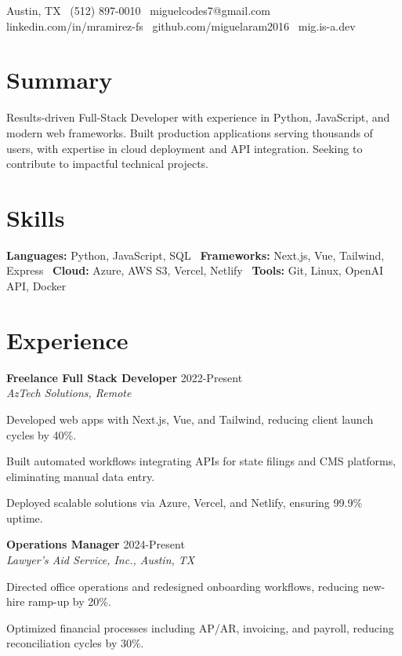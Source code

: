 \documentclass[letterpaper,10pt]{article}
\newcommand{\resumeItem}[1]{\item \small{#1}}
\begin{document}
\vspace{15pt}
 \vspace{8pt}
\begin{flushleft}
  Austin, TX \textbar\ (512) 897-0010 \textbar\ miguelcodes7@gmail.com \\
  linkedin.com/in/mramirez-fs \textbar\ github.com/miguelaram2016 \textbar\ mig.is-a.dev
\end{flushleft}
\vspace{6pt}

\section*{Summary}
Results-driven Full-Stack Developer with experience in Python, JavaScript, and modern web frameworks. Built production applications serving thousands of users, with expertise in cloud deployment and API integration. Seeking to contribute to impactful technical projects.

\section*{Skills}
\textbf{Languages:} Python, JavaScript, SQL \textbar\ \textbf{Frameworks:} Next.js, Vue, Tailwind, Express \textbar\ \textbf{Cloud:} Azure, AWS S3, Vercel, Netlify \textbar\ \textbf{Tools:} Git, Linux, OpenAI API, Docker

\section*{Experience}
\textbf{Freelance Full Stack Developer} \hfill 2022-Present \\
\textit{AzTech Solutions, Remote}
\begin{compactitem}
  \resumeItem{Developed web apps with Next.js, Vue, and Tailwind, reducing client launch cycles by 40\%.}
  \resumeItem{Built automated workflows integrating APIs for state filings and CMS platforms, eliminating manual data entry.}
  \resumeItem{Deployed scalable solutions via Azure, Vercel, and Netlify, ensuring 99.9\% uptime.}
\end{compactitem}

\textbf{Operations Manager} \hfill 2024-Present \\
\textit{Lawyer's Aid Service, Inc., Austin, TX}
\begin{compactitem}
  \resumeItem{Directed office operations and redesigned onboarding workflows, reducing new-hire ramp-up by 20\%.}
  \resumeItem{Optimized financial processes including AP/AR, invoicing, and payroll, reducing reconciliation cycles by 30\%.}
\end{compactitem}
\end{document}
